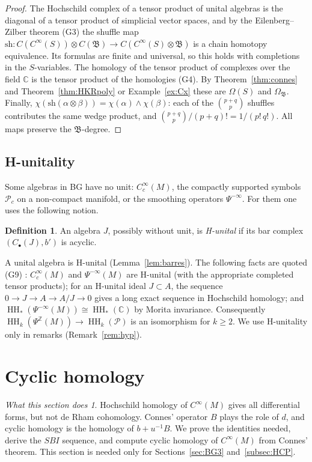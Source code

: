 \documentclass[11pt,oneside,reqno]{article}
\DeclareMathOperator{\HH}{HH}
\newcommand{\C}{\mathbb C}
\newcommand{\Z}{\mathbb Z}
\newcommand{\cP}{\mathcal P}
\newcommand{\CI}{C^\infty}
\newcommand{\Om}{\Omega}
\theoremstyle{plain}
\theoremstyle{definition}
\newtheorem{definition}[theorem]{Definition}
\theoremstyle{remark}
\newtheorem*{whatdoes}{What this section does}
\begin{document}
\begin{proof}
The Hochschild complex of a tensor product of unital algebras is the
diagonal of a tensor product of simplicial vector spaces, and by the
Eilenberg--Zilber theorem (G3) the shuffle map
\(\mathrm{sh}:C(\CI(S))\otimes C(\mathfrak B)\to C(\CI(S)\otimes\mathfrak B)\)
is a chain homotopy equivalence. Its formulas are finite and universal,
so this holds with completions in the \(S\)-variables. The homology of the
tensor product of complexes over the field \(\C\) is the tensor product of
the homologies (G4). By Theorem~\ref{thm:connes} and
Theorem~\ref{thm:HKRpoly} or Example~\ref{ex:Cx} these are
\(\Om(S)\) and \(\Om_{\mathfrak B}\). Finally,
\(\chi(\mathrm{sh}(\alpha\otimes\beta))=\chi(\alpha)\wedge\chi(\beta)\): each
of the \(\binom{p+q}p\) shuffles contributes the same wedge product, and
\(\binom{p+q}{p}/(p+q)!=1/(p!\,q!)\). All maps preserve the
\(\mathfrak B\)-degree.
\end{proof}

\subsection{H-unitality}\label{subsec:Hunital}
Some algebras in BG have no unit: \(\CI_c(M)\), the compactly supported
symbols \(\cP_c\) on a non-compact manifold, or the smoothing operators
\(\Psi^{-\infty}\). For them one uses the following notion.

\begin{definition}
An algebra \(J\), possibly without unit, is \emph{H-unital} if its bar
complex \((C_\bullet(J),b')\) is acyclic.
\end{definition}

A unital algebra is H-unital (Lemma~\ref{lem:barres}). The following
facts are quoted (G9) \cite{Wodzicki-excision}: \(\CI_c(M)\) and
\(\Psi^{-\infty}(M)\) are H-unital (with the appropriate completed tensor
products); for an H-unital ideal \(J\subset A\), the sequence \(0\to J\to A\to
A/J\to0\) gives a long exact sequence in Hochschild homology; and
\(\HH_*(\Psi^{-\infty}(M))\cong\HH_*(\C)\) by Morita invariance. Consequently
\(\HH_k(\Psi^{\Z}(M))\to\HH_k(\cP)\) is
an isomorphism for \(k\ge2\). We use H-unitality only in remarks
(Remark~\ref{rem:hyp}).

\section{Cyclic homology}\label{sec:HC}

\begin{whatdoes}
Hochschild homology of \(\CI(M)\) gives all differential forms, but not de
Rham cohomology. Connes' operator \(B\) plays the role of \(d\), and cyclic
homology is the homology of \(b+u^{-1}B\). We prove the identities needed,
derive the \(SBI\) sequence, and compute cyclic homology of \(\CI(M)\) from
Connes' theorem. This section is needed only for
Sections~\ref{sec:BG3} and~\ref{subsec:HCP}.
\end{whatdoes}
\end{document}
